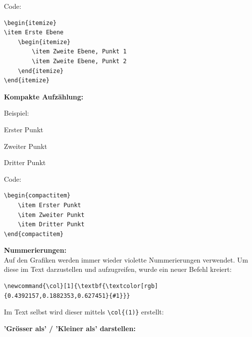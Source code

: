 Code:

\begin{verbatim}
\begin{itemize}
\item Erste Ebene
	\begin{itemize}
		\item Zweite Ebene, Punkt 1
		\item Zweite Ebene, Punkt 2
	\end{itemize}
\end{itemize}
\end{verbatim}

\textbf{Kompakte Aufzählung:}

Beispiel:\\
\begin{compactitem}
	\item Erster Punkt
	\item Zweiter Punkt
	\item Dritter Punkt
\end{compactitem}

\vspace{\baselineskip}

Code:

\begin{verbatim}
\begin{compactitem}
	\item Erster Punkt
	\item Zweiter Punkt
	\item Dritter Punkt
\end{compactitem}
\end{verbatim}

\vspace{\baselineskip}


\pagebreak
\textbf{Nummerierungen:}\\
Auf den Grafiken werden immer wieder violette Nummerierungen verwendet. Um diese im Text darzustellen und aufzugreifen, wurde ein neuer Befehl kreiert:

\begin{verbatim}
\newcommand{\col}[1]{\textbf{\textcolor[rgb]{0.4392157,0.1882353,0.627451}{#1}}}
\end{verbatim}

Im Text selbst wird dieser mittels \verb+\col{(1)}+ erstellt: 

\vspace{\baselineskip}

\textbf{'Grösser als' / 'Kleiner als' darstellen:}

